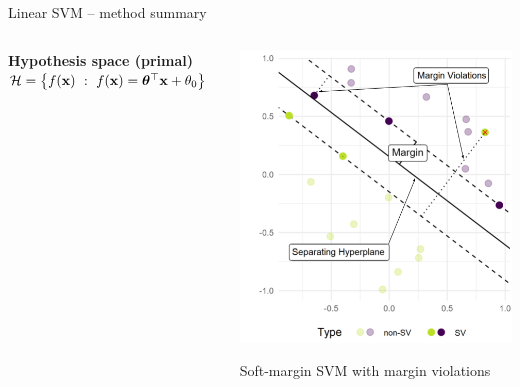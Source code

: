 \documentclass[11pt,compress,t,notes=noshow, xcolor=table]{beamer}
\newcommand{\highlight}[1]{\textcolor{hlcol}{\textbf{#1}}}
\begin{document}
\begin{vbframe}{Linear SVM -- method summary}
\begin{columns}[T]
\begin{column}{0.7\linewidth}
\medskip

\highlight{Hypothesis space (primal)} ~~ 
$\mathcal{H} = \left\{f(\mathbf{x}) ~:~f(\mathbf{x}) = \bm{\theta}^\top \mathbf{x} + \theta_0 \right\}$\\

\end{column}
\begin{column}{0.3\linewidth}
  
\includegraphics[width=\linewidth]{figure/svm_wording.png} \\
\begin{center}
\tiny{Soft-margin SVM with margin violations}
\end{center}
\end{column}
\end{columns}






\framebreak


\end{vbframe}
\end{document}
